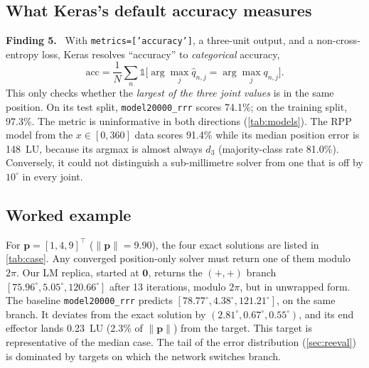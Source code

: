 \documentclass[conference]{IEEEtran}
\newcommand{\p}{\mathbf{p}}
\newcommand{\code}[1]{\texttt{#1}}
\newcommand{\finding}[1]{\par\smallskip\noindent\textbf{Finding #1.}~}
\begin{document}
\subsection{What Keras's default accuracy measures}
\label{sec:audit-metric}

\finding{5} With \code{metrics=['accuracy']}, a three-unit output, and a non-cross-entropy loss, Keras resolves ``accuracy'' to \emph{categorical} accuracy,
\[
\mathrm{acc} = \frac1N\sum_n \mathbb{1}\big[\arg\max_j \hat q_{n,j} = \arg\max_j q_{n,j}\big].
\]
This only checks whether the \emph{largest of the three joint values} is in the same position. On its test split, \code{model20000\_rrr} scores 74.1\%; on the training split, 97.3\%. The metric is uninformative in both directions (\cref{tab:models}). The RPP model from the $x\in[0,360]$ data scores 91.4\% while its median position error is 148~LU, because its argmax is almost always $d_3$ (majority-class rate 81.0\%). Conversely, it could not distinguish a sub-millimetre solver from one that is off by $10^\circ$ in every joint.

\subsection{Worked example}
\label{sec:audit-provenance}

For $\p=[1,4,9]^\top$ ($\|\p\|=9.90$), the four exact solutions are listed in \cref{tab:case}. Any converged position-only solver must return one of them modulo $2\pi$. Our LM replica, started at $\mathbf{0}$, returns the $(+,+)$ branch $[75.96^\circ, 5.05^\circ, 120.66^\circ]$ after 13 iterations, modulo $2\pi$, but in unwrapped form. The baseline \code{model20000\_rrr} predicts $[78.77^\circ, 4.38^\circ, 121.21^\circ]$, on the same branch. It deviates from the exact solution by $(2.81^\circ, 0.67^\circ, 0.55^\circ)$, and its end effector lands 0.23~LU (2.3\% of $\|\p\|$) from the target. This target is representative of the median case. The tail of the error distribution (\cref{sec:reeval}) is dominated by targets on which the network switches branch.
\end{document}
